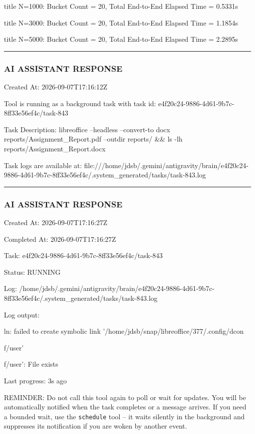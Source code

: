 \documentclass[11pt,a4paper]{article}
\begin{document}
title N=1000: Bucket Count = 20, Total End-to-End Elapsed Time = 0.5331s

title N=3000: Bucket Count = 20, Total End-to-End Elapsed Time = 1.1854s

title N=5000: Bucket Count = 20, Total End-to-End Elapsed Time = 2.2895s


\hrule

\subsubsection{AI ASSISTANT RESPONSE}

Created At: 2026-09-07T17:16:12Z

Tool is running as a background task with task id: e4f20c24-9886-4d61-9b7c-8ff33e56ef4c/task-843

Task Description: libreoffice --headless --convert-to docx reports/Assignment\_Report.pdf --outdir reports/ \&\& ls -lh reports/Assignment\_Report.docx

Task logs are available at: file:///home/jdsb/.gemini/antigravity/brain/e4f20c24-9886-4d61-9b7c-8ff33e56ef4c/.system\_generated/tasks/task-843.log


\hrule

\subsubsection{AI ASSISTANT RESPONSE}

Created At: 2026-09-07T17:16:27Z

Completed At: 2026-09-07T17:16:27Z

Task: e4f20c24-9886-4d61-9b7c-8ff33e56ef4c/task-843

Status: RUNNING

Log: /home/jdsb/.gemini/antigravity/brain/e4f20c24-9886-4d61-9b7c-8ff33e56ef4c/.system\_generated/tasks/task-843.log

Log output:

ln: failed to create symbolic link '/home/jdsb/snap/libreoffice/377/.config/dcon

f/user'

f/user': File exists


Last progress: 3s ago



REMINDER: Do not call this tool again to poll or wait for updates. You will be automatically notified when the task completes or a message arrives. If you need a bounded wait, use the \texttt{schedule} tool -- it waits silently in the background and suppresses its notification if you are woken by another event.
\end{document}
